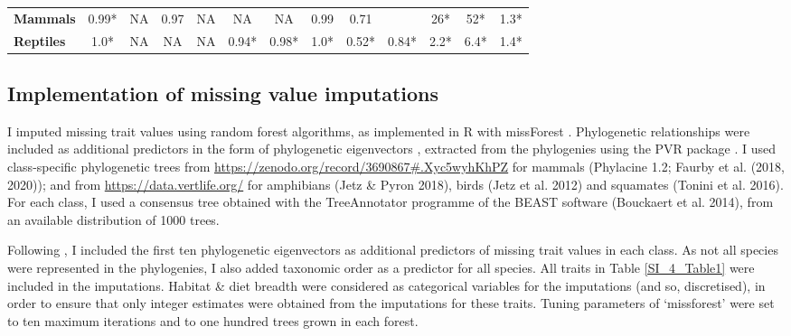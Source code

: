 \begin{table}[h!]
\begin{center}
\begin{tabular}{l|c|c|c|c|c|c|c|c|c|c|c|c|}
\multicolumn{1}{|l|}{\textbf{Mammals}}    & 0.99*       & NA          & 0.97        & NA          & NA          & NA         & 0.99         & 0.71    &    & 26*         & 52*      & 1.3*        \\ %
\multicolumn{1}{|l|}{\textbf{Reptiles}}   & 1.0*        & NA          & NA          & NA          & 0.94*       & 0.98*      & 1.0*         & 0.52*    & 0.84*  & 2.2*        & 6.4*     & 1.4*        \\ \hline
\end{tabular}
\end{center}
\end{table}

\subsection{Implementation of missing value imputations}
I imputed missing trait values using random forest algorithms, as implemented in R with missForest \citep{Stekhoven2012, Stekhoven2016}. Phylogenetic relationships were included as additional predictors in the form of phylogenetic eigenvectors \citep{DinizFilho2012}, extracted from the phylogenies using the PVR package \citep{Santos2018}. I used class-specific phylogenetic trees from \url{https://zenodo.org/record/3690867#.Xyc5wyhKhPZ} for mammals (Phylacine 1.2; Faurby et al. (2018, 2020)); and from \url{https://data.vertlife.org/} for amphibians (Jetz \& Pyron 2018), birds (Jetz et al. 2012) and squamates (Tonini et al. 2016). For each class, I used a consensus tree obtained with the TreeAnnotator programme of the BEAST software (Bouckaert et al. 2014), from an available distribution of 1000 trees. 

Following \citet{Penone2014}, I included the first ten phylogenetic eigenvectors as additional predictors of missing trait values in each class. As not all species were represented in the phylogenies, I also added taxonomic order as a predictor for all species. All traits in Table \ref{SI_4_Table1} were included in the imputations. Habitat \& diet breadth were considered as categorical variables for the imputations (and so, discretised), in order to ensure that only integer estimates were obtained from the imputations for these traits. Tuning parameters of `missforest' were set to ten maximum iterations and to one hundred trees grown in each forest.

